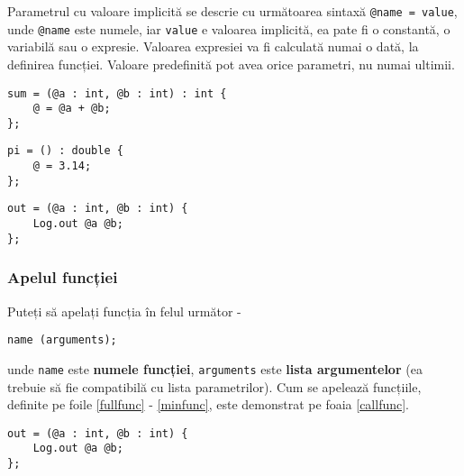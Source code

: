 Parametrul cu valoare implicită se descrie cu următoarea sintaxă \texttt{@name = value}, unde \texttt{@name} este numele, iar \texttt{value} e valoarea implicită, ea pate fi o constantă, o variabilă sau o expresie. Valoarea expresiei va fi calculată numai o dată, la definirea funcției. Valoare predefinită pot avea orice parametri, nu numai ultimii.

\begin{sourcecode}
\label{fullfunc}
\begin{verbatim}
sum = (@a : int, @b : int) : int {
	@ = @a + @b;
};
\end{verbatim}
\end{sourcecode}

\begin{sourcecode}
\label{noargsfunc}
\begin{verbatim}
pi = () : double {
	@ = 3.14;
};
\end{verbatim}
\end{sourcecode}

\begin{sourcecode}
\label{notypefunc}
\begin{verbatim}
out = (@a : int, @b : int) {
	Log.out @a @b;
};
\end{verbatim}
\end{sourcecode}

\subsubsection{Apelul funcției}

Puteți să apelați funcția în felul următor -
\begin{verbatim}
name (arguments);
\end{verbatim}
unde \texttt{name} este {\bf numele funcției}, \texttt{arguments} este {\bf lista argumentelor} (ea trebuie să fie compatibilă cu lista parametrilor). Cum se apelează funcțiile, definite pe foile \ref{fullfunc} - \ref{minfunc}, este demonstrat pe foaia \ref{callfunc}.

\begin{sourcecode}
\label{minfunc}
\begin{verbatim}
out = (@a : int, @b : int) {
	Log.out @a @b;
};
\end{verbatim}
\end{sourcecode}

